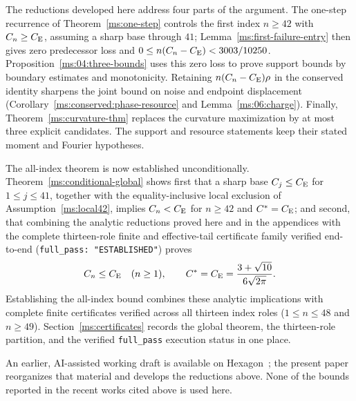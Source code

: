 The reductions developed here address four parts of the argument.
The one-step recurrence of Theorem~\ref{ms:one-step} controls the first
index $n\ge42$ with $C_n\ge C_{\mathrm E}$, assuming a sharp base through $41$;
Lemma~\ref{ms:first-failure-entry} then gives zero predecessor loss and
$0\le n(C_n-C_{\mathrm E})<3003/10250$. Proposition~\ref{ms:04:three-bounds}
uses this zero loss to prove support bounds by boundary estimates and
monotonicity. Retaining $n(C_n-C_{\mathrm E})\rho$ in the conserved identity
sharpens the joint bound on noise and endpoint displacement
(Corollary~\ref{ms:conserved:phase-resource} and
Lemma~\ref{ms:06:charge}). Finally, Theorem~\ref{ms:curvature-thm}
replaces the curvature maximization by at most three explicit candidates.
The support and resource statements keep their stated moment and
Fourier hypotheses.

The all-index theorem is now established unconditionally. Theorem~\ref{ms:conditional-global}
shows first that a sharp base $C_j\le C_{\mathrm E}$ for $1\le j\le41$,
together with the equality-inclusive local exclusion of
Assumption~\ref{ms:local42}, implies $C_n<C_{\mathrm E}$ for $n\ge42$ and $C^*=C_{\mathrm E}$;
and second, that combining the analytic reductions proved here and in the
appendices with the complete thirteen-role finite and effective-tail
certificate family verified end-to-end (\texttt{full\_pass: "ESTABLISHED"})
proves
\[
 C_n\le C_{\mathrm E}\quad(n\ge1),\qquad C^*=C_{\mathrm E}=\frac{3+\sqrt{10}}{6\sqrt{2\pi}}.
\]
Establishing the all-index bound combines these analytic implications with
complete finite certificates verified across all thirteen index roles
($1\le n\le48$ and $n\ge49$). Section~\ref{ms:certificates}
records the global theorem, the thirteen-role partition, and the verified
\texttt{full\_pass} execution status in one place.

An earlier, AI-assisted working draft is available on
Hexagon~\cite{rodziewiczkolodziejek2026momentdefects}; the present paper
reorganizes that material and develops the reductions above. None of the
bounds reported in the recent works cited above is used here.
